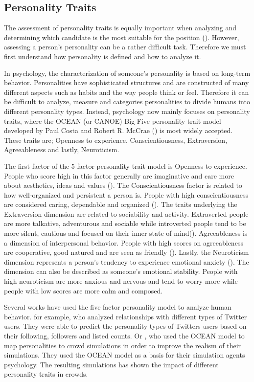 \subsection{Personality Traits}
The assessment of personality traits is equally important when analyzing and determining which candidate is the most suitable for the position (\cite{kinsman2005hiring}). However, assessing a person's personality can be a rather difficult task. Therefore we must first understand how personality is defined and how to analyze it. 

In psychology, the characterization of someone's personality is based on long-term behavior. Personalities have sophisticated structures and are constructed of many different aspects such as habits and the way people think or feel. Therefore it can be difficult to analyze, measure and categories personalities to divide humans into different personality types. Instead, psychology now mainly focuses on personality traits, where the OCEAN (or CANOE) Big Five personality trait model developed by Paul Costa and Robert R. McCrae (\cite{costa1992neo}) is most widely accepted. These traits are; Openness to experience, Conscientiousness, Extraversion, Agreeableness and lastly, Neuroticism. 

The first factor of the 5 factor personality trait model is Openness to experience. People who score high in this factor generally are imaginative and care more about aesthetics, ideas and values (\cite{mccrae1993openness}). The Conscientiousness factor is related to how well-organized and persistent a person is. People with high conscientiousness are considered caring, dependable and organized (\cite{widiger2017oxford}). The traits underlying the Extraversion dimension are related to sociability and activity. Extraverted people are more talkative, adventurous and sociable while introverted people tend to be more silent, cautious and focused on their inner state of mind(\cite{widiger2017oxford}). Agreeableness is a dimension of interpersonal behavior. People with high scores on agreeableness are cooperative, good natured and are seen as friendly (\cite{graziano1997agreeableness}). Lastly, the Neuroticism dimension represents a person's tendency to experience emotional anxiety (\cite{widiger2017oxford}). The dimension can also be described as someone's emotional stability. People with high neuroticism are more anxious and nervous and tend to worry more while people with low scores are more calm and composed. 

Several works have used the five factor personality model to analyze human behavior. \textcite{quercia2011our} for example, who analyzed relationships with different types of Twitter users. They were able to predict the personality types of Twitters users based on their following, followers and listed counts.  Or \textcite{allbeck2008creating}, who used the OCEAN model to map personalities to crowd simulations in order to improve the realism of their simulations. They used the OCEAN model as a basis for their simulation agents psychology. The resulting simulations has shown the impact of different personality traits in crowds. 

